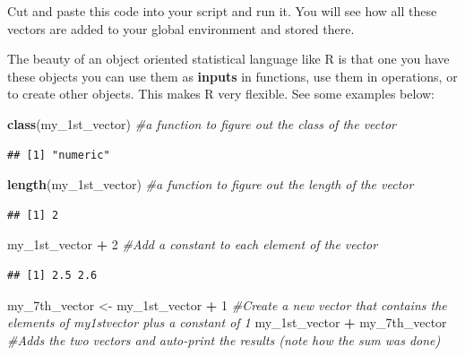 \documentclass[]{book}
\newenvironment{Shaded}{\begin{snugshade}}{\end{snugshade}}
\newcommand{\CommentTok}[1]{\textcolor[rgb]{0.56,0.35,0.01}{\textit{#1}}}
\newcommand{\DecValTok}[1]{\textcolor[rgb]{0.00,0.00,0.81}{#1}}
\newcommand{\KeywordTok}[1]{\textcolor[rgb]{0.13,0.29,0.53}{\textbf{#1}}}
\newcommand{\NormalTok}[1]{#1}
\newcommand{\OperatorTok}[1]{\textcolor[rgb]{0.81,0.36,0.00}{\textbf{#1}}}
\newcommand{\StringTok}[1]{\textcolor[rgb]{0.31,0.60,0.02}{#1}}
\theoremstyle{definition}
\theoremstyle{definition}
\theoremstyle{definition}
\theoremstyle{remark}
\begin{document}
Cut and paste this code into your script and run it. You will see how
all these vectors are added to your global environment and stored there.

The beauty of an object oriented statistical language like R is that one
you have these objects you can use them as \textbf{inputs} in functions,
use them in operations, or to create other objects. This makes R very
flexible. See some examples below:

\begin{Shaded}
\begin{Highlighting}[]
\KeywordTok{class}\NormalTok{(my_1st_vector) }\CommentTok{#a function to figure out the class of the vector}
\end{Highlighting}
\end{Shaded}

\begin{verbatim}
## [1] "numeric"
\end{verbatim}

\begin{Shaded}
\begin{Highlighting}[]
\KeywordTok{length}\NormalTok{(my_1st_vector) }\CommentTok{#a function to figure out the length of the vector}
\end{Highlighting}
\end{Shaded}

\begin{verbatim}
## [1] 2
\end{verbatim}

\begin{Shaded}
\begin{Highlighting}[]
\NormalTok{my_1st_vector }\OperatorTok{+}\StringTok{ }\DecValTok{2} \CommentTok{#Add a constant to each element of the vector}
\end{Highlighting}
\end{Shaded}

\begin{verbatim}
## [1] 2.5 2.6
\end{verbatim}

\begin{Shaded}
\begin{Highlighting}[]
\NormalTok{my_7th_vector <-}\StringTok{ }\NormalTok{my_1st_vector }\OperatorTok{+}\StringTok{ }\DecValTok{1} \CommentTok{#Create a new vector that contains the elements of my1stvector plus a constant of 1}
\NormalTok{my_1st_vector }\OperatorTok{+}\StringTok{ }\NormalTok{my_7th_vector }\CommentTok{#Adds the two vectors and auto-print the results (note how the sum was done)}
\end{Highlighting}
\end{Shaded}
\end{document}
